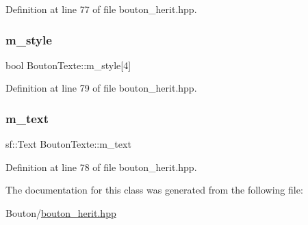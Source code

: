 Definition at line 77 of file bouton\+\_\+herit.\+hpp.

\mbox{\label{classBoutonTexte_a9103da6bfb25d8871e3fdbda942ec3d1}} 
\subsubsection{\texorpdfstring{m\+\_\+style}{m\_style}}
{\footnotesize\ttfamily bool Bouton\+Texte\+::m\+\_\+style\mbox{[}4\mbox{]}\hspace{0.3cm}{\ttfamily [protected]}}



Definition at line 79 of file bouton\+\_\+herit.\+hpp.

\mbox{\label{classBoutonTexte_a96c677df7e44162cc9206e84fe2692cf}} 
\subsubsection{\texorpdfstring{m\+\_\+text}{m\_text}}
{\footnotesize\ttfamily sf\+::\+Text Bouton\+Texte\+::m\+\_\+text\hspace{0.3cm}{\ttfamily [protected]}}



Definition at line 78 of file bouton\+\_\+herit.\+hpp.



The documentation for this class was generated from the following file\+:\begin{DoxyCompactItemize}
\item 
Bouton/\hyperlink{bouton__herit_8hpp}{bouton\+\_\+herit.\+hpp}\end{DoxyCompactItemize}
